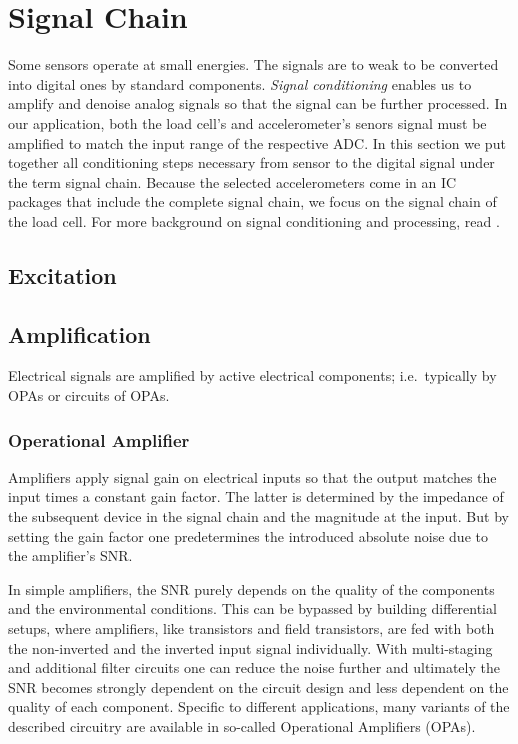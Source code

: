 \chapter{Signal Chain%
  \label{chap:\currfilebase}}

Some sensors operate at small energies. The signals are to weak to be converted into digital ones by standard components. \emph{Signal conditioning} enables us to amplify and denoise analog signals so that the signal can be further processed. In our application, both the load cell's and accelerometer's senors signal must be amplified to match the input range of the respective \ac{ADC}. In this section we put together all conditioning steps necessary from sensor to the digital signal under the term signal chain. Because the selected accelerometers come in an \ac{IC} packages that include the complete signal chain, we focus on the signal chain of the load cell. For more background on signal conditioning and processing, read .

\section{Excitation}

\section{Amplification}
Electrical signals are amplified by active electrical components; i.e.\ typically by \ac{OPA}s or circuits of \ac{OPA}s.

\subsection{Operational Amplifier}

Amplifiers apply signal gain on electrical inputs so that the output matches the input times a constant gain factor. The latter is determined by the impedance of the subsequent device in the signal chain and the magnitude at the input. But by setting the gain factor one predetermines the introduced absolute noise due to the amplifier's \ac{SNR}.

In simple amplifiers, the \ac{SNR} purely depends on the quality of the components and the environmental conditions. This can be bypassed by building differential setups, where amplifiers, like transistors and field transistors, are fed with both the non-inverted and the inverted input signal individually. With multi-staging and additional filter circuits one can reduce the noise further and ultimately the \ac{SNR} becomes strongly dependent on the circuit design and less dependent on the quality of each component. Specific to different applications, many variants of the described circuitry are available in so-called Operational Amplifiers (\acs{OPA}s).

